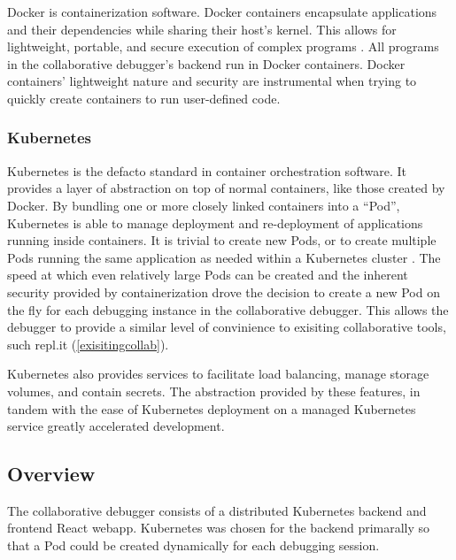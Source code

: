 \documentclass[12pt]{article}
\begin{document}
Docker is containerization software.  Docker containers encapsulate
applications and their dependencies while sharing their host's kernel.
This allows for lightweight, portable, and secure execution of complex
programs \cite{docker}.  All programs in the collaborative debugger's
backend run in Docker containers.  Docker containers' lightweight
nature and security are instrumental when trying to quickly create
containers to run user-defined code.

\subsubsection{Kubernetes}\label{k8s}

Kubernetes is the defacto standard in container orchestration
software.  It provides a layer of abstraction on top of normal
containers, like those created by Docker.  By bundling one or more
closely linked containers into a ``Pod'', Kubernetes is able to manage
deployment and re-deployment of applications running inside
containers.  It is trivial to create new Pods, or to create multiple
Pods running the same application as needed within a Kubernetes
cluster \cite{k8s}.  The speed at which even relatively large Pods can
be created and the inherent security provided by containerization
drove the decision to create a new Pod on the fly for each debugging
instance in the collaborative debugger.  This allows the debugger to
provide a similar level of convinience to exisiting collaborative
tools, such repl.it (\ref{exisitingcollab}).
\par

Kubernetes also provides services to facilitate load balancing, manage
storage volumes, and contain secrets.  The abstraction provided by
these features, in tandem with the ease of Kubernetes deployment on a
managed Kubernetes service\cite{do_managed_k8s} greatly accelerated
development.

\subsection{Overview}

The collaborative debugger consists of a distributed Kubernetes
backend and frontend React webapp.  Kubernetes was chosen for the
backend primarally so that a Pod could be created dynamically for each
debugging session.  
\end{document}
